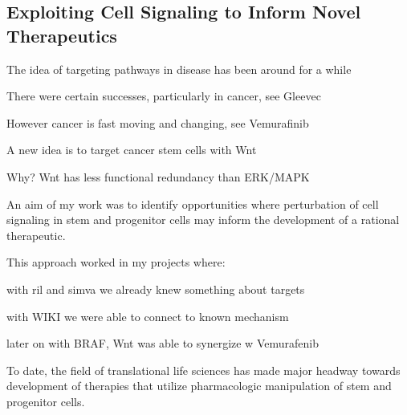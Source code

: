 \subsection{Exploiting Cell Signaling to Inform Novel Therapeutics}

The idea of targeting pathways in disease has been around for a while

There were certain successes, particularly in cancer, see Gleevec

However cancer is fast moving and changing, see Vemurafinib

A new idea is to target cancer stem cells with Wnt

Why? Wnt has less functional redundancy than ERK/MAPK

An aim of my work was to identify opportunities where perturbation of cell signaling in stem and progenitor cells may inform the development of a rational therapeutic.

This approach worked in my projects where:

with ril and simva we already knew something about targets

with WIKI we were able to connect to known mechanism

later on with BRAF, Wnt was able to synergize w Vemurafenib

To date, the field of translational life sciences has made major headway towards development of therapies that utilize pharmacologic manipulation of stem and progenitor cells. 